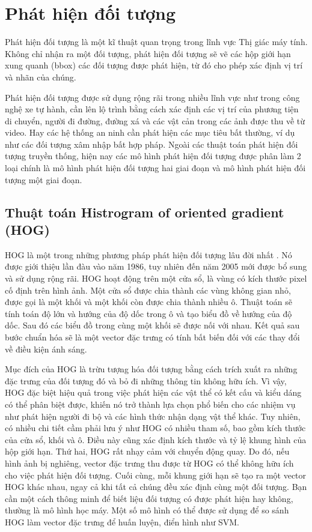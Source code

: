 \documentclass[../the.tex]{subfiles}
\begin{document}
\section{Phát hiện đối tượng}
{\fontsize{13}{12} \selectfont 	 
Phát hiện đối tượng là một kĩ thuật quan trọng trong lĩnh vực Thị giác máy tính. Không chỉ nhận ra một đối tượng, 
phát hiện đối tượng sẽ vẽ các hộp giới hạn xung quanh (bbox) các đối tượng được phát hiện, từ đó
cho phép xác định vị trí và nhãn của chúng. 

Phát hiện đối tượng được sử dụng rộng rãi trong nhiều lĩnh vực như trong công nghệ xe tự hành,
cần lên lộ trình bằng cách xác định các vị trí của phương tiện di chuyển, người đi đường, đường xá và các vật cản trong các ảnh được thu về từ video. Hay các hệ thống an ninh cần phát hiện các mục tiêu bất thường, ví dụ như các đối tượng xâm nhập bất hợp pháp.
Ngoài các thuật toán phát hiện đối tượng truyền thống, hiện nay các mô hình phát hiện đối tượng được phân làm 2 loại chính là mô hình phát hiện đối tượng hai giai đoạn và mô hình phát hiện đối tượng một giai đoạn.
}
\subsection{Thuật toán Histrogram of oriented gradient (HOG)}
{\fontsize{13}{12} \selectfont 	 
HOG là một trong những phương pháp phát hiện đối tượng lâu đời nhất \cite{dalal2005histograms}. Nó được giới thiệu lần đàu vào năm 1986,
tuy nhiên đến năm 2005 mới được bổ sung và sử dụng rộng rãi. HOG hoạt động trên một cửa sổ, là vùng có kích thước pixel cố định trên hình ảnh. Một cửa sổ được chia thành các vùng không gian nhỏ, được gọi là một khối và một khối còn được chia thành nhiều ô.
Thuật toán sẽ tính toán độ lớn và hướng của độ dốc trong ô và tạo biểu đồ về hướng của độ dốc. Sau đó các biểu đồ trong cùng một khối sẽ được nối với nhau.
Kết quả sau bước chuẩn hóa sẽ là một vector đặc trưng có tính bất biến đối với các thay đổi về điều kiện ánh sáng.

Mục đích của HOG là trừu tượng hóa đối tượng bằng cách trích xuất ra những đặc trưng của đối tượng đó và bỏ đi những thông tin không hữu ích.
Vì vậy, HOG đặc biệt hiệu quả trong việc phát hiện các vật thể có kết cấu và kiểu dáng có thể phân biệt được, khiến nó trở thành lựa chọn phổ biến cho các nhiệm vụ như phát hiện người đi bộ và các hình thức nhận dạng vật thể khác.
Tuy nhiên, có nhiều chi tiết cầm phải lưu ý như HOG có nhiều tham số, bao gồm kích thước của cửa sổ, khối và ô. Điều này cũng xác định kích thước và tỷ lệ khung hình của hộp giới hạn.
Thứ hai, HOG rất nhạy cảm với chuyển động quay. Do đó, nếu hình ảnh bị nghiêng, vector đặc trưng thu được từ HOG có thể không hữu ích cho việc phát hiện đối tượng.
Cuối cùng, mỗi khung giới hạn sẽ tạo ra một vector HOG khác nhau, ngay cả khi tất cả chúng đều xác định cùng một đối tượng. Bạn cần một cách thông minh để biết liệu đối tượng có được phát hiện hay không, thường là mô hình học máy. 
Một số mô hình có thể được sử dụng để so sánh HOG làm vector đặc trưng để huấn luyện, điển hình như SVM.
}
\end{document}

